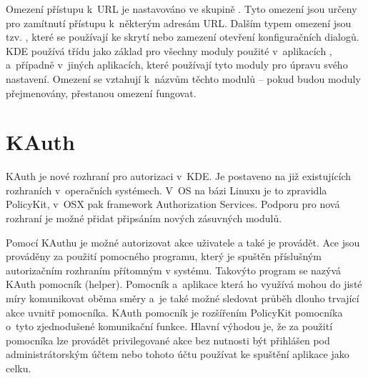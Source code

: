 Omezení přístupu k~URL je nastavováno ve skupině . Tyto omezení jsou určeny pro zamítnutí přístupu k~některým adresám URL.
% 
Dalším typem omezení jsou tzv. , které se používají ke skrytí nebo zamezení otevření konfiguračních dialogů. KDE používá třídu  jako základ pro všechny moduly použité v~aplikacích ,  a~případně v~jiných aplikacích, které používají tyto moduly pro úpravu svého nastavení. Omezení se vztahují k~názvům těchto modulů -- pokud budou moduly přejmenovány, přestanou omezení fungovat.

\section{KAuth}
KAuth je nové rozhraní pro autorizaci v~KDE. Je postaveno na již existujících rozhraních v~operačních systémech. V~OS na bázi Linuxu je to zpravidla PolicyKit, v~OSX pak framework Authorization Services. Podporu pro nová rozhraní je možné přidat připsáním nových zásuvných modulů.

Pomocí KAuthu je možné autorizovat akce uživatele a také je provádět. Ace jsou prováděny za použití pomocného programu, který je spuštěn příslušným autorizačním rozhraním přítomným v systému. Takovýto program se nazývá KAuth pomocník (helper). Pomocník a~aplikace která ho využívá mohou do jisté míry komunikovat oběma směry a~je také možné sledovat průběh dlouho trvající akce uvnitř pomocníka. KAuth pomocník je rozšířením PolicyKit pomocníka o~tyto zjednodušené komunikační funkce. Hlavní výhodou je, že za použití pomocníka lze provádět privilegované akce bez nutnosti být přihlášen pod administrátorským účtem nebo tohoto účtu používat ke spuštění aplikace jako celku.

